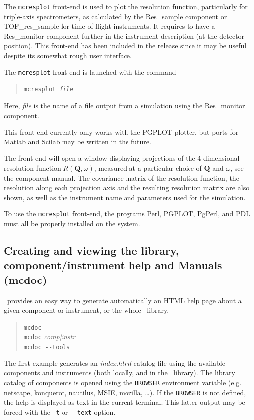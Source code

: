 The \verb+mcresplot+ front-end is used to plot the resolution function,
particularly for triple-axis
spectrometers, as calculated by the Res\_sample component or TOF\_res\_sample
for time-of-flight instruments. It requires to have a Res\_monitor component
further in the instrument description (at the detector position).
This front-end
has been included in the release since it may be useful
despite its somewhat rough user interface.

The \verb+mcresplot+ front-end is launched with the command
\begin{quote}
  \texttt{mcresplot {\it file\/}}
\end{quote}
Here, {\it file\/} is the name of a file output from a simulation using
the Res\_monitor component.

This front-end currently only works with the PGPLOT plotter, but ports for
Matlab and Scilab may be written in the future.

The front-end will open a window displaying projections of the 4-dimensional
resolution function $R(\boldsymbol{Q}, \omega)$, measured at a
particular choice of $\boldsymbol{Q}$ and $\omega$, see the component
manual. The covariance matrix of the
resolution function, the resolution along each projection axis and the resulting
resolution matrix are also shown, as well as the instrument name and parameters
used for the simulation.

To use the \verb+mcresplot+ front-end, the programs Perl, PGPLOT, PgPerl,
and PDL must all be properly installed on the system.

\subsection{Creating and viewing the library, component/instrument help and
  Manuals (mcdoc)}
\label{s:mcdoc-run}

\MCS\ provides an easy way to generate automatically an HTML help page about a
given component or instrument, or the whole \MCS\
library. 
\begin{quote}
  \verb|mcdoc|\\
  \verb|mcdoc| {\it comp|instr}\\
  \verb|mcdoc --tools|
\end{quote}
The first example generates an {\it index.html} catalog file using the available
components and instruments (both locally, and in the \MCS\ library). The library
catalog of components is opened using the \verb+BROWSER+ environment variable
\index{Environment variable!BROWSER} (e.g. netscape, konqueror, nautilus, MSIE,
mozilla, \ldots). If the \verb+BROWSER+ is not defined, the help is displayed as
text in the current terminal. This latter output may be forced with the
\verb+-t+ or \verb+--text+ option.

